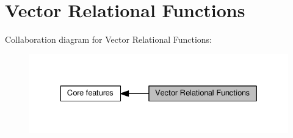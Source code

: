 \hypertarget{group__core__func__vector__relational}{}\section{Vector Relational Functions}
\label{group__core__func__vector__relational}
Collaboration diagram for Vector Relational Functions\+:
\nopagebreak
\begin{figure}[H]
\begin{center}
\leavevmode
\includegraphics[width=329pt]{d8/d06/group__core__func__vector__relational}
\end{center}
\end{figure}
